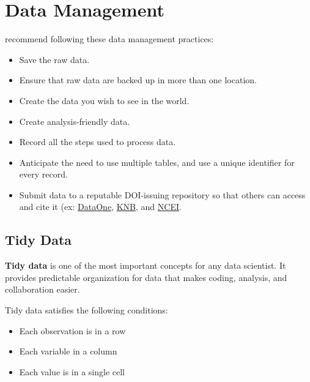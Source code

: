 \documentclass[
]{book}
\providecommand{\tightlist}{%
  \setlength{\itemsep}{0pt}\setlength{\parskip}{0pt}}
\begin{document}
\hypertarget{data-management}{%
\section{Data Management}\label{data-management}}

\citet{Wilson_2017} recommend following these data management practices:

\begin{itemize}
\tightlist
\item
  Save the raw data.
\item
  Ensure that raw data are backed up in more than one location.
\item
  Create the data you wish to see in the world.
\item
  Create analysis-friendly data.
\item
  Record all the steps used to process data.
\item
  Anticipate the need to use multiple tables, and use a unique identifier for every record.
\item
  Submit data to a reputable DOI-issuing repository so that others can access and cite it (ex: \href{https://www.dataone.org/}{DataOne}, \href{https://knb.ecoinformatics.org/}{KNB}, and \href{https://www.ncei.noaa.gov/access/search/index}{NCEI}.
\end{itemize}

\hypertarget{tidy-data}{%
\subsection{Tidy Data}\label{tidy-data}}

\textbf{Tidy data} is one of the most important concepts for any data scientist. It provides predictable organization for data that makes coding, analysis, and collaboration easier.

Tidy data satisfies the following conditions:

\begin{itemize}
\tightlist
\item
  Each observation is in a row
\item
  Each variable in a column
\item
  Each value is in a single cell
\end{itemize}
\end{document}
